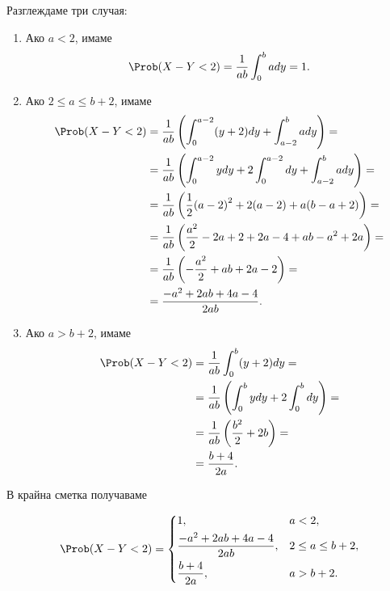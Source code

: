\documentclass[numbers=endperiod, bibliography=totocnumbered]{scrartcl}
\begin{document}
\begin{solution}
\begin{enumerate}[label=\alph*)]
    Разглеждаме три случая:
    \begin{enumerate}[label=\arabic*)]
      \item Ако \( a < 2 \), имаме
      \begin{equation*}
        \Prob(X - Y < 2)
        =
        \frac 1 {ab} \int_0^b a dy
        =
        1.
      \end{equation*}

      \item Ако \( 2 \leq a \leq b + 2 \), имаме
      \begin{align*}
        \Prob(X - Y < 2)
        &=
        \frac 1 {ab} \left(\int_0^{a-2} (y+2) dy + \int_{a-2}^b a dy \right)
        = \\ &=
        \frac 1 {ab} \left(\int_0^{a-2} y dy + 2 \int_0^{a-2} dy + \int_{a-2}^b a dy \right)
        = \\ &=
        \frac 1 {ab} \left(\frac 1 2 {(a-2)}^2 + 2(a-2) + a(b-a+2) \right)
        = \\ &=
        \frac 1 {ab} \left(\frac {a^2} 2 - 2a + 2 + 2a - 4 + ab - a^2 + 2a \right)
        = \\ &=
        \frac 1 {ab} \left(-\frac {a^2} 2 + ab + 2a - 2 \right)
        = \\ &=
        \frac {-a^2 + 2ab + 4a - 4} {2ab}.
      \end{align*}

      \item Ако \( a > b + 2 \), имаме
      \begin{align*}
        \Prob(X - Y < 2)
        &=
        \frac 1 {ab} \int_0^b (y+2) dy
        = \\ &=
        \frac 1 {ab} \left( \int_0^b y dy + 2 \int_0^b dy \right)
        = \\ &=
        \frac 1 {ab} \left(\frac {b^2} 2 + 2b \right)
        = \\ &=
        \frac {b + 4} {2a}.
      \end{align*}
    \end{enumerate}

    В крайна сметка получаваме

    \begin{align*}
      \Prob(X - Y < 2) = \begin{dcases}
        1, &a < 2, \\
        \frac {-a^2 + 2ab + 4a - 4} {2ab}, &2 \leq a \leq b + 2, \\
        \frac {b + 4} {2a}, &a > b + 2.
      \end{dcases}
    \end{align*}
  \end{enumerate}
\end{solution}

\printbibliography
\end{document}
